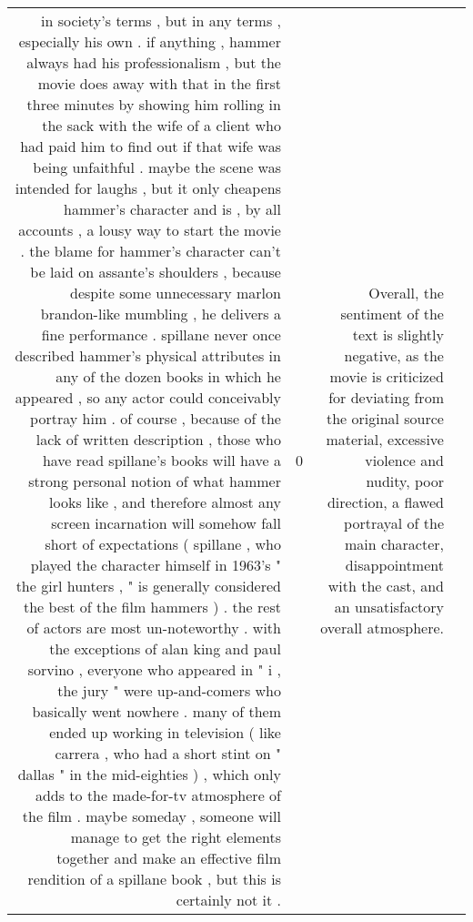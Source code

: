 \begin{tabular}{r{1cm} p{0.4in} r{1cm} p{0.4in}}
in society's terms , but in any terms , especially his own .  if anything , hammer always had his professionalism , but the movie does away with that in the first three minutes by showing him rolling in the sack with the wife of a client who had paid him to find out if that wife was being unfaithful .  maybe the scene was intended for laughs , but it only cheapens hammer's character and is , by all accounts , a lousy way to start the movie .  the blame for hammer's character can't be laid on assante's shoulders , because despite some unnecessary marlon brandon-like mumbling , he delivers a fine performance .  spillane never once described hammer's physical attributes in any of the dozen books in which he appeared , so any actor could conceivably portray him .  of course , because of the lack of written description , those who have read spillane's books will have a strong personal notion of what hammer looks like , and therefore almost any screen incarnation will somehow fall short of expectations ( spillane , who played the character himself in 1963's " the girl hunters , " is generally considered the best of the film hammers ) .  the rest of actors are most un-noteworthy .  with the exceptions of alan king and paul sorvino , everyone who appeared in " i , the jury " were up-and-comers who basically went nowhere .  many of them ended up working in television ( like carrera , who had a short stint on " dallas " in the mid-eighties ) , which only adds to the made-for-tv atmosphere of the film .  maybe someday , someone will manage to get the right elements together and make an effective film rendition of a spillane book , but this is certainly not it .   & 0 & Overall, the sentiment of the text is slightly negative, as the movie is criticized for deviating from the original source material, excessive violence and nudity, poor direction, a flawed portrayal of the main character, disappointment with the cast, and an unsatisfactory overall atmosphere. \\

\end{tabular}
